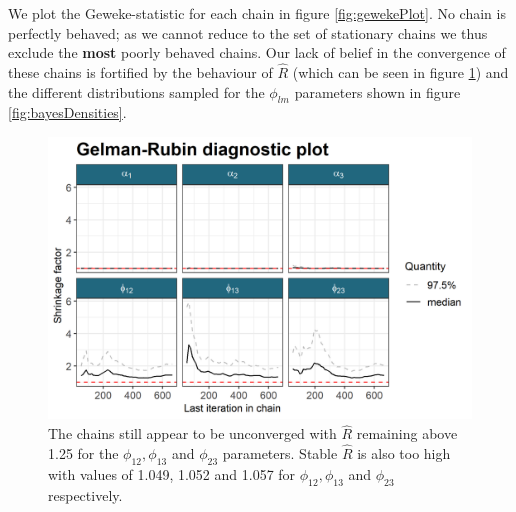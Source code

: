 \documentclass[]{article}
\begin{document}
We plot the Geweke-statistic for each chain in figure \ref{fig:gewekePlot}. No chain is perfectly behaved; as we cannot reduce to the set of stationary chains we thus exclude the \textbf{most} poorly behaved chains. Our lack of belief in the convergence of these chains is fortified by the behaviour of $\hat{R}$ (which can be seen in figure \ref{fig:gelmanPlot}) and the different distributions sampled for the $\phi_{lm}$ parameters shown in figure \ref{fig:bayesDensities}.
\begin{figure}
	\centering
	\includegraphics[scale=1.0]{./Images/Yeast/Convergence/gelmanPlot.png}
	\caption{The chains still appear to be unconverged with $\hat{R}$ remaining above 1.25 for the $\phi_{12}, \phi_{13}$ and $\phi_{23}$ parameters. Stable $\hat{R}$ is also too high with values of 1.049, 1.052 and 1.057 for $\phi_{12}, \phi_{13}$ and $\phi_{23}$ respectively.}
	\label{fig:gelmanPlot}
\end{figure}
\end{document}
